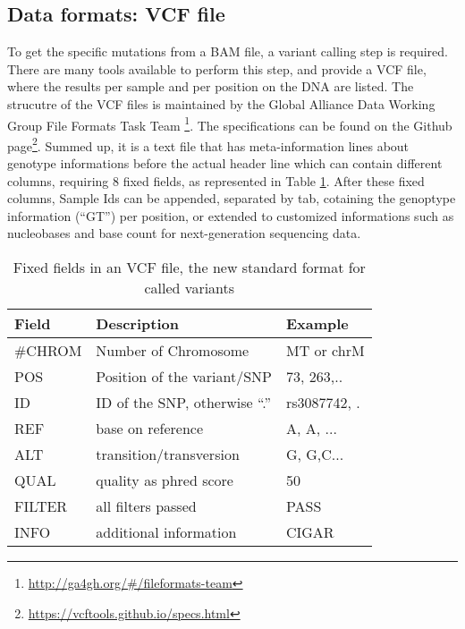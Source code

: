 \subsection{Data formats: VCF file}\label{intro:VCF}
To get the specific mutations from a BAM file, a variant calling step is required. There are many tools available to perform this step, and provide a VCF file, where the results per sample and per position on the DNA are listed. The strucutre of the VCF files is maintained by the Global Alliance Data Working Group File Formats Task Team \footnote{\url{http://ga4gh.org/\#/fileformats-team}}. The specifications can be found on the Github page\footnote{\url{https://vcftools.github.io/specs.html}}. Summed up, it is a text file that has meta-information lines about genotype informations before the actual header line which can contain different columns, requiring 8 fixed fields, as represented in Table \ref{table:vcf}. After these fixed columns, Sample Ids can be appended, separated by tab, cotaining the genoptype information ("`GT"') per position, or extended to customized informations such as nucleobases and base count for next-generation sequencing data.

\begin{table}[H]
  \begin{tabular}{lll}
    \toprule
    Field & Description & Example \\
		\midrule
    \#CHROM & Number of Chromosome & MT or chrM \\
    POS & Position of the variant/SNP & 73, 263,.. \\
    ID & ID of the SNP, otherwise "`."' & rs3087742, .\\
    REF & base on reference & A, A, ...\\
    ALT & transition/transversion & G, G,C...\\
    QUAL & quality as phred score & 50 \\
    FILTER & all filters passed & PASS \\
    INFO & additional information & CIGAR \\
		\bottomrule
\end{tabular}
\caption{Fixed fields in an VCF file, the new standard format for called variants}
\label{table:vcf}
\end{table}

